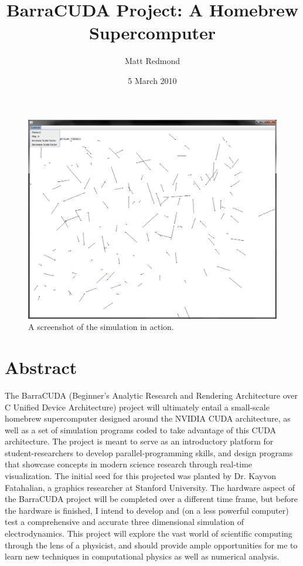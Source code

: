 \documentclass[10pt]{article}
\title{BarraCUDA Project: A Homebrew Supercomputer}
\author{Matt Redmond}
\date{5 March 2010}
\begin{document}
\maketitle
\tableofcontents
\begin{figure}[h]
	\centering
		\includegraphics[width=1.00\textwidth]{barracuda2DScreenshot.png}
	\caption{A screenshot of the simulation in action.}
	\label{fig:barracuda2DScreenshot}
\end{figure}

\clearpage

\section{Abstract}
The BarraCUDA (Beginner's Analytic Research and Rendering Architecture over C Unified Device Architecture) project will ultimately entail a small-scale homebrew supercomputer designed around the NVIDIA CUDA architecture, as well as a set of simulation programs coded to take advantage of this CUDA architecture. The project is meant to serve as an introductory platform for student-researchers to develop parallel-programming skills, and design programs that showcase concepts in modern science research through real-time visualization. The initial seed for this projected was planted by Dr. Kayvon Fatahalian, a graphics researcher at Stanford University. The hardware aspect of the BarraCUDA project will be completed over a different time frame, but before the hardware is finished, I intend to develop and (on a less powerful computer) test a comprehensive and accurate three dimensional simulation of electrodynamics. This project will explore the vast world of scientific computing through the lens of a physicist, and should provide ample opportunities for me to learn new techniques in computational physics as well as numerical analysis.
\end{document}

